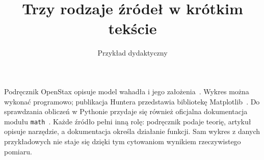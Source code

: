 \documentclass[a4paper,11pt]{article}
\title{Trzy rodzaje źródeł w krótkim tekście}
\author{Przykład dydaktyczny}
\date{}
\begin{document}
\maketitle
Podręcznik OpenStax opisuje model wahadła i jego założenia~\cite{moebs2016}.
Wykres można wykonać programowo; publikacja Huntera przedstawia
bibliotekę Matplotlib~\cite{hunter2007}. Do sprawdzania obliczeń w Pythonie
przydaje się również oficjalna dokumentacja modułu
\texttt{math}~\cite{pythonmath2026}. Każde źródło pełni inną rolę:
podręcznik podaje teorię, artykuł opisuje narzędzie, a dokumentacja
określa działanie funkcji. Sam wykres z danych przykładowych nie staje
się dzięki tym cytowaniom wynikiem rzeczywistego pomiaru.


\end{document}
